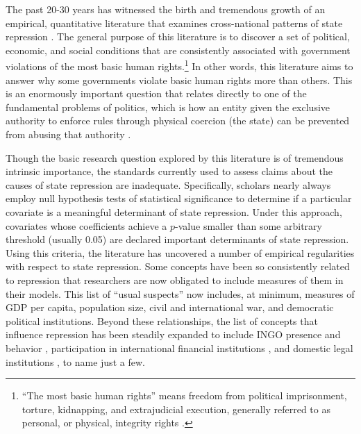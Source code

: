 \documentclass[12pt]{article}
\begin{document}
The past 20-30 years has witnessed the birth and tremendous growth of an empirical, quantitative literature that examines cross-national patterns of state repression \citep[See, e.g.,][]{Stohletal1986, Park1987, McCormickMitchell1988, Henderson1991, Henderson1993, PoeTate1994, Davenport1995, Fein1995, Davenport1999, CingranelliRichards1999isq, Keith1999, Poeetal1999, Apodaca2001, RichardsGellenySacko2001,  Hathaway2002, Keith2002PRQ, DavenportArmstrong2004, BDMetal2005, HafnerBurton2005jpr, HafnerBurtonTsutsui2005, Davenport2007AR, Davenport2007, KeithTatePoe2009, CingranelliFilippov2010}. The general purpose of this literature is to discover a set of political, economic, and social conditions that are consistently associated with government violations of the most basic human rights.\footnote{``The most basic human rights'' means freedom from political imprisonment, torture, kidnapping, and extrajudicial execution, generally referred to as personal, or physical, integrity rights \citep[See, e.g.][]{PoeTate1994, CingranelliRichards1999isq}.} In other words, this literature aims to answer why some governments violate basic human rights more than others. This is an enormously important question that relates directly to one of the fundamental problems of politics, which is how an entity given the exclusive authority to enforce rules through physical coercion (the state) can be prevented from abusing that authority \citep[See, e.g.,][]{Moore2010}. 

Though the basic research question explored by this literature is of tremendous intrinsic importance, the standards currently used to assess claims about the causes of state repression are inadequate. Specifically, scholars nearly always employ null hypothesis tests of statistical significance to determine if a particular covariate is a meaningful determinant of state repression. Under this approach, covariates whose coefficients achieve a $p$-value smaller than some arbitrary threshold (usually 0.05) are declared important determinants of state repression. Using this criteria, the literature has uncovered a number of empirical regularities with respect to state repression. Some concepts have been so consistently related to repression that researchers are now obligated to include measures of them in their models. This list of ``usual suspects'' now includes, at minimum, measures of GDP per capita, population size, civil and international war, and democratic political institutions. Beyond these relationships, the list of concepts that influence repression has been steadily expanded to include INGO presence and behavior \citep{HafnerBurtonTsutsui2005, MurdieDavis2012}, participation in international financial institutions \citep{AbouharbCingranelli2006, AbouharbCingranelli2007}, and domestic legal institutions \citep{Cross1999, KeithTatePoe2009, Mitchell2013}, to name just a few. 
\end{document}
